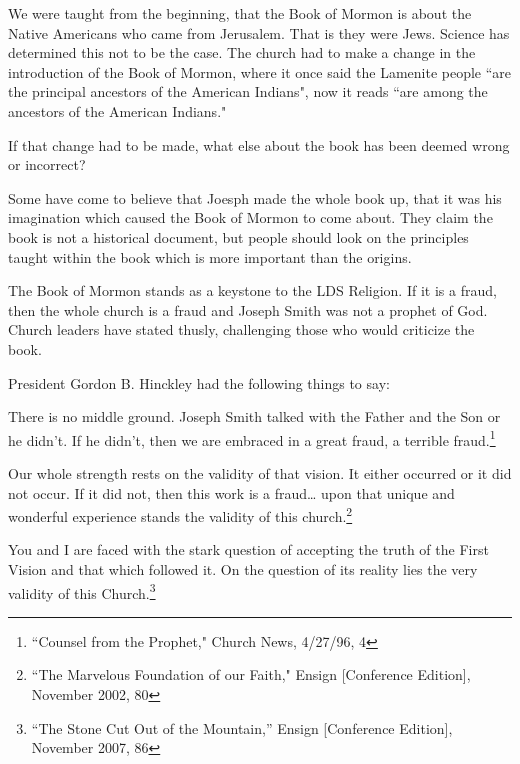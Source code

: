 We were taught from the beginning, that the Book of Mormon is about the Native
Americans who came from Jerusalem. That is they were Jews. Science has determined
this not to be the case. The church had to make a change in the introduction of the
Book of Mormon, where it once said the Lamenite people ``are the principal ancestors 
of the American Indians", now it reads ``are among the ancestors of the American 
Indians."

If that change had to be made, what else about the book has been deemed wrong or
incorrect?

Some have come to believe that Joesph made the whole book up, that it was his
imagination which caused the Book of Mormon to come about. They claim the book is not
a historical document, but people should look on the principles taught within the
book which is more important than the origins.

The Book of Mormon stands as a keystone to the LDS Religion. If it is a fraud, then
the whole church is a fraud and Joseph Smith was not a prophet of God. Church leaders
have stated thusly, challenging those who would criticize the book.

President Gordon B. Hinckley had the following things to say:

\begin{displayquote}
There is no middle ground. Joseph Smith talked with the Father and the Son or 
he didn’t. If he didn’t, then we are embraced in a great fraud, a terrible 
fraud.\footnote{``Counsel from the Prophet," Church News, 4/27/96, 4}
\end{displayquote}

\begin{displayquote}
Our whole strength rests on the validity of that vision. It either occurred or 
it did not occur. If it did not, then this work is a fraud… upon that unique and 
wonderful experience stands the validity of this church.\footnote{
``The Marvelous Foundation of our Faith," Ensign [Conference Edition], 
November 2002, 80
}
\end{displayquote}

\begin{displayquote}
You and I are faced with the stark question of accepting the truth of the First 
Vision and that which followed it. On the question of its reality lies the very 
validity of this Church.\footnote{“The Stone Cut Out of the Mountain,” Ensign 
[Conference Edition], November 2007, 86}
\end{displayquote}

